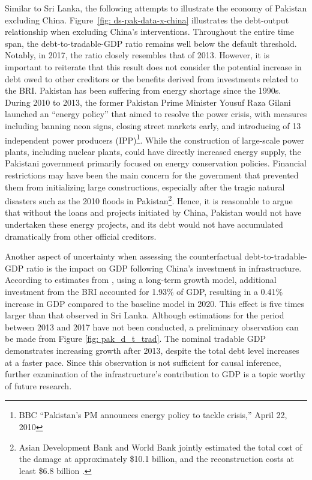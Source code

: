 Similar to Sri Lanka, the following attempts to illustrate the economy of Pakistan excluding China. Figure~\ref{fig: ds-pak-data-x-china} illustrates the debt-output relationship when excluding China's interventions. Throughout the entire time span, the debt-to-tradable-GDP ratio remains well below the default threshold. Notably, in 2017, the ratio closely resembles that of 2013. However, it is important to reiterate that this result does not consider the potential increase in debt owed to other creditors or the benefits derived from investments related to the BRI.
Pakistan has been suffering from energy shortage since the 1990s. During 2010 to 2013, the former Pakistan Prime Minister Yousuf Raza Gilani launched an ``energy policy'' that aimed to resolve the power crisis, with measures including banning neon signs, closing street markets early, and introducing of 13 independent power producers (IPP)\footnote{
    BBC ``Pakistan's PM announces energy policy to tackle crisis,'' April 22, 2010
}. While the construction of large-scale power plants, including nuclear plants, could have directly increased energy supply, the Pakistani government primarily focused on energy conservation policies. Financial restrictions may have been the main concern for the government that prevented them from initializing large constructions, especially after the tragic natural disasters such as the 2010 floods in Pakistan\footnote{
    Asian Development Bank and World Bank jointly estimated the total cost of the damage at approximately \$10.1 billion, and the reconstruction costs at least \$6.8 billion \citep{pakistan-flood}.
}.
Hence, it is reasonable to argue that without the loans and projects initiated by China, Pakistan would not have undertaken these energy projects, and its debt would not have accumulated dramatically from other official creditors.

Another aspect of uncertainty when assessing the counterfactual debt-to-tradable-GDP ratio is the impact on GDP following China's investment in infrastructure. According to estimates from \citet*{Bandiera-Vasileios-BRI-debt}, using a long-term growth model, additional investment from the BRI accounted for 1.93\% of GDP, resulting in a 0.41\% increase in GDP compared to the baseline model in 2020. This effect is five times larger than that observed in Sri Lanka. Although estimations for the period between 2013 and 2017 have not been conducted, a preliminary observation can be made from Figure \ref{fig: pak_d_t_trad}. The nominal tradable GDP demonstrates increasing growth after 2013, despite the total debt level increases at a faster pace. Since this observation is not sufficient for causal inference, further examination of the infrastructure's contribution to GDP is a topic worthy of future research.